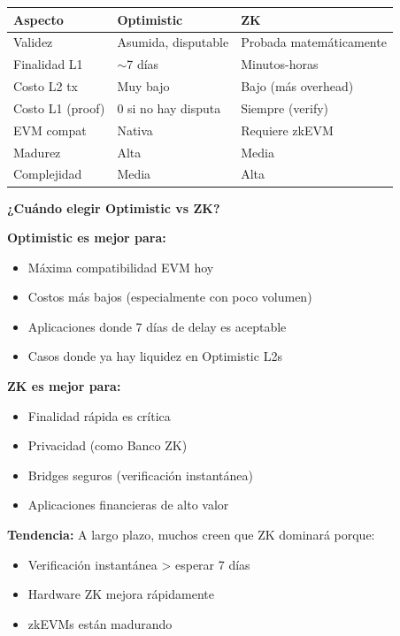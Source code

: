 \documentclass[11pt,a4paper,twoside,openright]{book}
\theoremstyle{definition}
\theoremstyle{plain}
\theoremstyle{remark}
\begin{document}
\begin{center}
\begin{tabular}{lll}
\toprule
\textbf{Aspecto} & \textbf{Optimistic} & \textbf{ZK} \\
\midrule
Validez & Asumida, disputable & Probada matemáticamente \\
Finalidad L1 & $\sim$7 días & Minutos-horas \\
Costo L2 tx & Muy bajo & Bajo (más overhead) \\
Costo L1 (proof) & 0 si no hay disputa & Siempre (verify) \\
EVM compat & Nativa & Requiere zkEVM \\
Madurez & Alta & Media \\
Complejidad & Media & Alta \\
\bottomrule
\end{tabular}
\end{center}

\begin{keyidea}
\textbf{¿Cuándo elegir Optimistic vs ZK?}

\textbf{Optimistic es mejor para:}
\begin{itemize}
    \item Máxima compatibilidad EVM hoy
    \item Costos más bajos (especialmente con poco volumen)
    \item Aplicaciones donde 7 días de delay es aceptable
    \item Casos donde ya hay liquidez en Optimistic L2s
\end{itemize}

\textbf{ZK es mejor para:}
\begin{itemize}
    \item Finalidad rápida es crítica
    \item Privacidad (como Banco ZK)
    \item Bridges seguros (verificación instantánea)
    \item Aplicaciones financieras de alto valor
\end{itemize}

\textbf{Tendencia:} A largo plazo, muchos creen que ZK dominará porque:
\begin{itemize}
    \item Verificación instantánea > esperar 7 días
    \item Hardware ZK mejora rápidamente
    \item zkEVMs están madurando
\end{itemize}
\end{keyidea}
\end{document}

